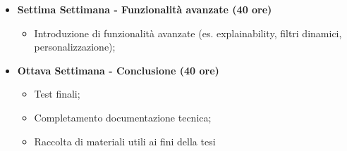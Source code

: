 {\begin{itemize}
        \begin{itemize}
            \item Integrazione del prototipo con strumenti aziendali;
            \item UX di base;
            \item Miglioramento del flusso di utilizzo;
        \end{itemize}
        \item \textbf{Settima Settimana - Funzionalità avanzate (40 ore)} 
        \begin{itemize}
            \item Introduzione di funzionalità avanzate (es. explainability, filtri dinamici, personalizzazione);
        \end{itemize}
        \item \textbf{Ottava Settimana - Conclusione (40 ore)} 
        \begin{itemize}
            \item Test finali;
            \item Completamento documentazione tecnica;
            \item Raccolta di materiali utili ai fini della tesi
        \end{itemize}
    \end{itemize}
}

\newcommand{\totaleOre}{320}

\newcommand{\obiettiviObbligatori}{
	 \item \underline{\textit{O01}}: Acquisizione di competenze pratiche su Oribea/DialogSphere;
	 \item \underline{\textit{O02}}: Connessione a database e gestione dati aziendali o pubblici;
	 \item \underline{\textit{O03}}: Implementazione di un Task AI per l’analisi di bilancio con LLM
	 \item \underline{\textit{O04}}: Generazione automatica di report con output coerente, chiaro e adattabile;
	 \item \underline{\textit{O05}}: Testing e documentazione completa del prototipo;
	 
}

\newcommand{\obiettiviDesiderabili}{
	 \item \underline{\textit{D01}}: Ottimizzazione del Task AI per performance e scalabilità;
	 \item \underline{\textit{D02}}: Personalizzazione dinamica dei prompt per casi d’uso differenti;
	 \item \underline{\textit{D03}}: Integrazione con strumenti di visualizzazione o interfacce utente;
}

\newcommand{\obiettiviFacoltativi}{
	 \item \underline{\textit{F01}}: Sviluppo di una semplice interfaccia chatbot o dashboard interattiva;
	 \item \underline{\textit{F02}}: Sperimentazione di tecniche di Explainable AI (XAI) per la trasparenza dei risultati;
	 \item \underline{\textit{F03}}: Esportazione automatica dei report in PDF/HTML o invio via e-mail;
}